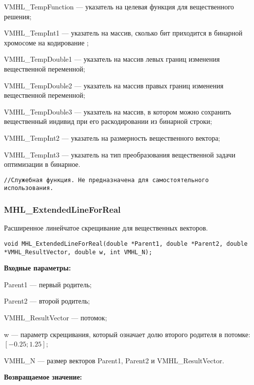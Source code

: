 \documentclass[a4paper,12pt]{article}
\begin{document}
VMHL\_TempFunction --- указатель на целевая функция для вещественного решения;
 
VMHL\_TempInt1 --- указатель на массив, сколько бит приходится в бинарной хромосоме на кодирование ;
 
VMHL\_TempDouble1 --- указатель на массив левых границ изменения вещественной переменной;
 
VMHL\_TempDouble2 --- указатель на массив правых границ изменения вещественной переменной;
 
VMHL\_TempDouble3 --- указатель на массив, в котором можно сохранить вещественный индивид при его раскодировании из бинарной строки;
 
VMHL\_TempInt2 --- указатель на размерность вещественного вектора;
 
VMHL\_TempInt3 --- указатель на тип преобразования вещественной задачи оптимизации в бинарное.



\begin{lstlisting}[label=code_use_MHL_BinaryFitnessFunction,caption=Пример использования]
//Служебная функция. Не предназначена для самостоятельного использования.
\end{lstlisting}

\subsubsection{MHL\_ExtendedLineForReal}\label{MHL_ExtendedLineForReal}

Расширенное линейчатое скрещивание для вещественных векторов.


\begin{lstlisting}[label=code_syntax_MHL_ExtendedLineForReal,caption=Синтаксис]
void MHL_ExtendedLineForReal(double *Parent1, double *Parent2, double *VMHL_ResultVector, double w, int VMHL_N);
\end{lstlisting}

\textbf{Входные параметры:}
 
Parent1 --- первый родитель;
 
Parent2 --- второй родитель;
 
VMHL\_ResultVector --- потомок;

w --- параметр скрещивания, который означает долю второго родителя в потомке: $[-0.25;1.25]$;
 
VMHL\_N --- размер векторов Parent1, Parent2 и VMHL\_ResultVector.

\textbf{Возвращаемое значение:}
\end{document}
